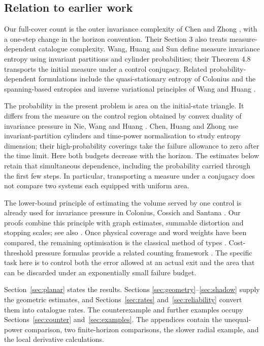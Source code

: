\documentclass[11pt]{amsart}
\theoremstyle{definition}
\theoremstyle{remark}
\numberwithin{equation}{section}
\begin{document}
\subsection{Relation to earlier work}
Our full-cover count is the outer invariance complexity of Chen
and Zhong \cite[Section 2.2]{CZ2024}, with a one-step change in
the horizon convention. Their Section 3 also treats
measure-dependent catalogue complexity. Wang, Huang and Sun
\cite{WHS2019} define measure invariance entropy using invariant
partitions and cylinder probabilities; their Theorem 4.8 transports
the initial measure under a control conjugacy. Related
probability-dependent formulations include the quasi-stationary
entropy of Colonius \cite{Colonius2018} and the spanning-based
entropies and inverse variational principles of Wang and Huang
\cite{WH2022}.

The probability in the present problem is area on the initial-state
triangle. It differs from the measure on the control region obtained
by convex duality of invariance pressure in Nie, Wang and Huang
\cite{NWH2022}. Chen, Huang and Zhong \cite{CHZ2026} use
invariant-partition cylinders and time-power normalisation to study
entropy dimension; their high-probability coverings take the failure
allowance to zero after the time limit. Here both budgets decrease
with the horizon. The estimates below retain that simultaneous
dependence, including the probability carried through the first few
steps. In particular, transporting a measure under a conjugacy does
not compare two systems each equipped with uniform area.

The lower-bound principle of estimating the volume served by one
control is already used for invariance pressure in Colonius,
Cossich and Santana \cite{CCS2020}. Our proofs combine this
principle with graph estimates, summable distortion and stopping
scales; see also \cite{Hutchinson1981,KD2018}. Once physical
coverage and word weights have been compared, the remaining
optimisation is the classical method of types \cite{Csiszar1998}.
Cost-threshold pressure formulas provide a related counting
framework \cite{YCYZ2025}. The specific task here is to control
both the error allowed at an actual exit and the area that can be
discarded under an exponentially small failure budget.

Section~\ref{sec:planar} states the results. Sections
\ref{sec:geometry}--\ref{sec:shadow} supply the geometric estimates,
and Sections~\ref{sec:rates} and~\ref{sec:reliability} convert
them into catalogue rates. The counterexample and further examples
occupy Sections~\ref{sec:counter} and~\ref{sec:examples}.
The appendices contain the unequal-power comparison, two
finite-horizon comparisons, the slower radial example, and the
local derivative calculations.
\end{document}
